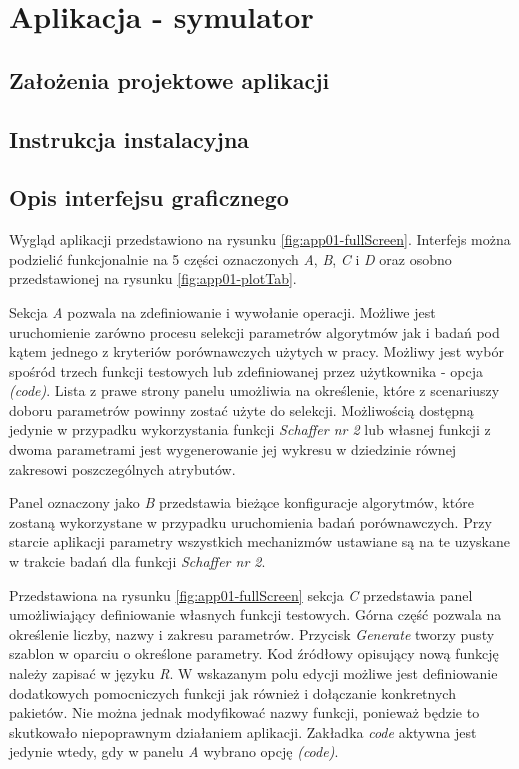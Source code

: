 \chapter{Aplikacja - symulator}
\label{ch:dodatekA-aplikacja}
\section{Założenia projektowe aplikacji}
\section{Instrukcja instalacyjna}
\section{Opis interfejsu graficznego}

\par
Wygląd aplikacji przedstawiono na rysunku \ref{fig:app01-fullScreen}. Interfejs można podzielić funkcjonalnie na 5 części oznaczonych \emph{A}, \emph{B}, \emph{C} i \emph{D} oraz osobno przedstawionej na rysunku \ref{fig:app01-plotTab}. 

\par
Sekcja \emph{A} pozwala na zdefiniowanie i wywołanie operacji. Możliwe jest uruchomienie zarówno procesu selekcji parametrów algorytmów jak i badań pod kątem jednego z kryteriów porównawczych użytych w pracy. Możliwy jest wybór spośród trzech funkcji testowych lub zdefiniowanej przez użytkownika - opcja \emph{(code)}. Lista z prawe strony panelu umożliwia na określenie, które z scenariuszy doboru parametrów powinny zostać użyte do selekcji. Możliwością dostępną jedynie w przypadku wykorzystania funkcji \emph{Schaffer nr 2} lub własnej funkcji z dwoma parametrami jest wygenerowanie jej wykresu w dziedzinie równej zakresowi poszczególnych atrybutów. 

\par
Panel oznaczony jako \emph{B} przedstawia bieżące konfiguracje algorytmów, które zostaną wykorzystane w przypadku uruchomienia badań porównawczych. Przy starcie aplikacji parametry wszystkich mechanizmów ustawiane są na te uzyskane w trakcie badań dla funkcji \emph{Schaffer nr 2}.

\par
Przedstawiona na rysunku \ref{fig:app01-fullScreen} sekcja \emph{C} przedstawia panel umożliwiający definiowanie własnych funkcji testowych. Górna część pozwala na określenie liczby, nazwy i zakresu parametrów. Przycisk \emph{Generate} tworzy pusty szablon w oparciu o określone parametry. Kod źródłowy opisujący nową funkcję należy zapisać w języku \emph{R}. W wskazanym polu edycji możliwe jest definiowanie dodatkowych pomocniczych funkcji jak również i dołączanie konkretnych pakietów. Nie można jednak modyfikować nazwy funkcji, ponieważ będzie to skutkowało niepoprawnym działaniem aplikacji. Zakładka \emph{code} aktywna jest jedynie wtedy, gdy w panelu \emph{A} wybrano opcję \emph{(code)}.


